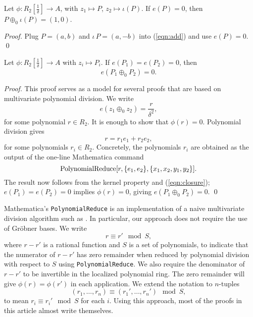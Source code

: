 \documentclass{llncs}
\newcommand{\op}[1]{\hbox{#1}}
\newcommand{\f}[1]{\frac{1}{#1}}
\begin{document}
\begin{lemma} [inverse] 
  Let $\phi:R_2[\f{\delta}]\to A$, with $z_1\mapsto P$, $z_2\mapsto
  \iota(P)$.  If $e(P)=0$, then $P\oplus_0 \iota(P) = (1,0)$.
\end{lemma}

\begin{proof} Plug $P=(a,b)$ and $\iota\,P=(a,-b)$ into
  (\ref{eqn:add}) and use $e(P)=0$.
\qed\end{proof}

\begin{lemma}\label{lemma:closure}
  Let $\phi:R_2[\f{\delta}]\to A$ with $z_i\mapsto P_i$.  If
  $e(P_1)=e(P_2)=0$, then
  \[
  e(P_1 \oplus_0 P_2) = 0.
  \]
\end{lemma}

\begin{proof} This proof serves as a model for several proofs that are
  based on multivariate polynomial division.  We write
\[
e(z_1\oplus_0 z_2) = \frac{r}{\delta^2},
\]
for some polynomial $r \in R_2$.  It is enough to show that
$\phi(r)=0$.  Polynomial division gives
\begin{equation}\label{eqn:closure}
r= r_1 e_1 + r_2 e_2,
\end{equation}
for some polynomials $r_i\in R_2$.  Concretely, the polynomials $r_i$
are obtained as the output of the one-line Mathematica command
\[
\op{PolynomialReduce}[r,\{e_1,e_2\},\{x_1,x_2,y_1,y_2\}].
\]
The result now follows from the kernel property and
(\ref{eqn:closure}); $ e(P_1) = e(P_2) = 0$ implies $\phi(r)= 0$,
giving ${e}(P_1\oplus_0 P_2)=0$.
\qed\end{proof}

Mathematica's {\tt PolynomialReduce} is an implementation of a naive multivariate division algorithm
such as \cite{cox1992ideals}.  In particular, our approach does not
require the use of Gr\"obner bases.  We write
\[
r \equiv r' \mod S,
\]
where $r-r'$ is a rational function and $S$ is a set of polynomials,
to indicate that the numerator of $r-r'$ has zero remainder when
reduced by polynomial division with respect to $S$ using {\tt PolynomialReduce}.  We
also require the denominator of $r-r'$ to be invertible in the
localized polynomial ring.  The zero remainder will give
$\phi(r)=\phi(r')$ in each application.  We extend the notation to
$n$-tuples
\[
(r_1,\ldots,r_n) \equiv (r_1',\ldots,r_n') \mod S,
\]
to mean $r_i \equiv r_i' \mod S$ for each $i$.  Using this approach,
most of the proofs in this article almost write themselves.
\end{document}
